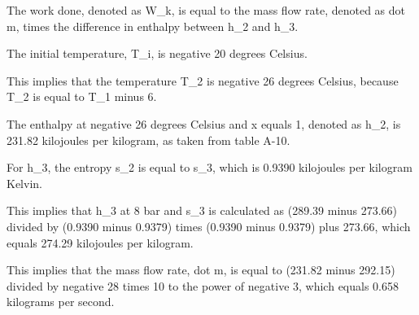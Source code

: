 The work done, denoted as W_k, is equal to the mass flow rate, denoted as dot m, times the difference in enthalpy between h_2 and h_3.

The initial temperature, T_i, is negative 20 degrees Celsius.

This implies that the temperature T_2 is negative 26 degrees Celsius, because T_2 is equal to T_1 minus 6.

The enthalpy at negative 26 degrees Celsius and x equals 1, denoted as h_2, is 231.82 kilojoules per kilogram, as taken from table A-10.

For h_3, the entropy s_2 is equal to s_3, which is 0.9390 kilojoules per kilogram Kelvin.

This implies that h_3 at 8 bar and s_3 is calculated as (289.39 minus 273.66) divided by (0.9390 minus 0.9379) times (0.9390 minus 0.9379) plus 273.66, which equals 274.29 kilojoules per kilogram.

This implies that the mass flow rate, dot m, is equal to (231.82 minus 292.15) divided by negative 28 times 10 to the power of negative 3, which equals 0.658 kilograms per second.
